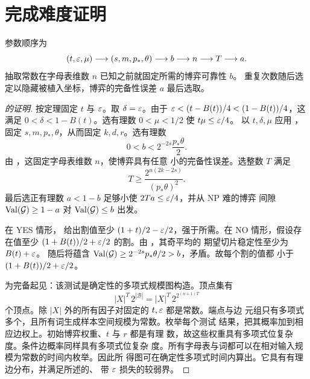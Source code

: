 \section{完成难度证明}\label{sec:completion}

参数顺序为
\[
 (t,\varepsilon,\mu)\longrightarrow(s,m,p_*,\theta)
 \longrightarrow b\longrightarrow n\longrightarrow T\longrightarrow a.
\]
抽取常数在字母表维数 $n$ 已知之前就固定所需的博弈可靠性 $b$。
重复次数随后选定以隐藏被植入坐标，博弈的完备性误差 $a$ 最后选取。

\begin{proof}[ 的证明]
按定理固定 $t$ 与 $\varepsilon$。取 $\delta=\varepsilon$。由于
$\varepsilon<(t-B(t))/4<(1-B(t))/4$，这满足 $0<\delta<1-B(t)$。选有理数
$0<\mu<1/2$ 使 $t\mu\le\varepsilon/4$。
以 $t,\delta,\mu$ 应用 ，固定
$s,m,p_*,\theta$，从而固定 $k,d,r$。选有理数
\[
 0<b<2^{-2s}\frac{p_*\theta}{2}.
\]
由 ，这固定字母表维数 $n$，使博弈具有任意
小的完备性误差。选整数 $T$ 满足
\[
 T\ge\frac{2^{n(2k-2s)}}{(p_*\theta)^2}.
\]
最后选正有理数 $a<1-b$ 足够小使 $2Ta\le\varepsilon/4$，并从 NP 难的博弈
间隙 $\operatorname{Val}(\mathcal G)\ge1-a$ 对 $\operatorname{Val}(\mathcal G)\le b$ 出发。

在 YES 情形， 给出割值至少
$(1+t)/2-\varepsilon/2$，强于所需。在 NO 情形，假设存在值至少
$(1+B(t))/2+\varepsilon/2$ 的割。由 ，其奇平均的
期望切片稳定性至少为 $B(t)+\varepsilon$。
 随后将蕴含
$\operatorname{Val}(\mathcal G)\ge2^{-2s}p_*\theta/2>b$，矛盾。故每个割的值都
小于 $(1+B(t))/2+\varepsilon/2$。

为完备起见：该测试是确定性的多项式规模图构造。顶点集有
\[
 |X|^T\,2^{|\mathcal B|}
 =|X|^T\,2^{2^{(n+1)T}}
\]
个顶点。除 $|X|$ 外的所有因子对固定的 $t,\varepsilon$ 都是常数。端点与边
元组只有多项式多个，且所有词生成样本空间规模为常数。枚举每个测试
结果，把其概率加到相应边权上。初始博弈权重、$t$ 与 $r$ 都是有理
数，故这些权重具有多项式位复杂度。条件边概率同样具有多项式位复杂
度。所有字母表与词都可以在相对输入规模为常数的时间内枚举。因此所
得图可在确定性多项式时间内算出。它具有有理边分布，并满足所述的、
带 $\varepsilon$ 损失的较弱界。
\end{proof}

